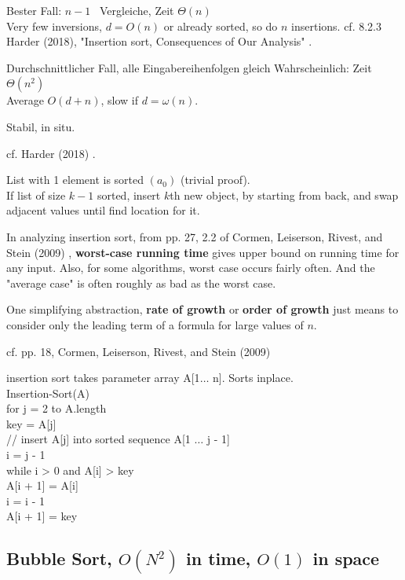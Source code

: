 \documentclass[10pt]{amsart}
\begin{document}
\begin{multicols*}{2}
Bester Fall: $n-1$ \, Vergleiche, Zeit $\Theta(n)$ \\ Very few inversions, $d= O(n)$ or already sorted, so do $n$ insertions. cf. 8.2.3 Harder (2018), "Insertion sort, Consequences of Our Analysis" \cite{Hard2018}. 

Durchschnittlicher Fall, alle Eingabereihenfolgen gleich Wahrscheinlich: Zeit $\Theta(n^2)$ \\

Average $O(d+n)$, slow if $d= \omega(n)$.

Stabil, in situ.

cf. Harder (2018) \cite{Hard2018}.

List with 1 element is sorted $(a_0)$ (trivial proof). \\

If list of size $k-1$ sorted, insert $k$th new object, by starting from back, and swap adjacent values until find location for it.

In analyzing insertion sort, from pp. 27, 2.2 of Cormen, Leiserson, Rivest, and Stein (2009) \cite{CLRS2009}, \textbf{worst-case running time} gives upper bound on running time for any input. Also, for some algorithms, worst case occurs fairly often. And the "average case" is often roughly as bad as the worst case.

One simplifying abstraction, \textbf{rate of growth} or \textbf{order of growth} just means to consider only the leading term of a formula for large values of $n$.

cf. pp. 18, Cormen, Leiserson, Rivest, and Stein (2009) \cite{CLRS2009}

insertion sort takes parameter array A[1$\dots$ n]. Sorts inplace. \\

Insertion-Sort(A) \\
for j = 2 to A.length \\
\quad key = A[j] \\
\quad // insert A[j] into sorted sequence A[1 $\dots$ j - 1] \\
\quad i = j - 1\\
\quad while i > 0 and A[i] > key \\
\quad \quad A[i + 1] = A[i] \\
\quad \quad i = i - 1\\
\quad A[i + 1] = key \\

\subsection{Bubble Sort, $O(N^2)$ in time, $O(1)$ in space}


\end{multicols*}
\end{document}
